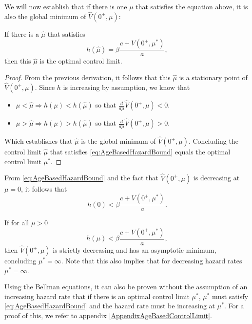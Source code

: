 We will now establish that if there is one $\mu$ that satisfies the equation above, it is also the global minimum of $\hat{V}(0^+,\mu)$:
\begin{lemma}\label{lemma:AgeBasedControlLimit}
	If there is a $\hat{\mu}$ that satisfies
	\begin{equation}\label{eq:AgeBasedHazardBound}
	h(\hat{\mu})=\beta\frac{c+V(0^+,\mu^*)}{a},
	\end{equation}
	then this $\hat{\mu}$ is the optimal control limit.
	\begin{proof}
		From the previous derivation, it follows that this $\hat{\mu}$ is a stationary point of $\hat{V}(0^+,\mu)$.
		Since $h$ is increasing by assumption, we know that
		\begin{itemize}
			\item $\mu<\hat{\mu}\Rightarrow h(\mu)<h(\hat{\mu})$ so that $\frac{d}{d\mu}\hat{V}(0^+,\mu)<0$.
			\item $\mu>\hat{\mu}\Rightarrow h(\mu)>h(\hat{\mu})$ so that $\frac{d}{d\mu}\hat{V}(0^+,\mu)>0$.
		\end{itemize}
		Which establishes that $\hat{\mu}$ is the global minimum of $\hat{V}(0^+,\mu)$.
		Concluding the control limit $\hat{\mu}$ that satisfies \eqref{eq:AgeBasedHazardBound} equals the optimal control limit $\mu^*$.
	\end{proof}
\end{lemma}
\begin{corollary}
	From \eqref{eq:AgeBasedHazardBound} and the fact that $\hat{V}(0^+,\mu)$ is decreasing at $\mu=0$, it follows that
	\[
	h(0)<\beta\frac{c+V(0^+,\mu^*)}{a}.
	\]
\end{corollary}
\begin{corollary}
If for all $\mu>0$
\[
h(\mu)<\beta\frac{c+V(0^+,\mu^*)}{a},
\]
then $\hat{V}(0^+,\mu)$ is strictly decreasing and has an asymptotic minimum, concluding $\mu^*=\infty$.
Note that this also implies that for decreasing hazard rates $\mu^*=\infty$.
\end{corollary}

\begin{remark}
	Using the Bellman equations, it can also be proven without the assumption of an increasing hazard rate that if there is an optimal control limit $\mu^*$, $\mu^*$ must satisfy \eqref{eq:AgeBasedHazardBound} and the hazard rate must be increasing at $\mu^*$.
	For a proof of this, we refer to appendix \ref{AppendixAgeBasedControlLimit}.
\end{remark}

